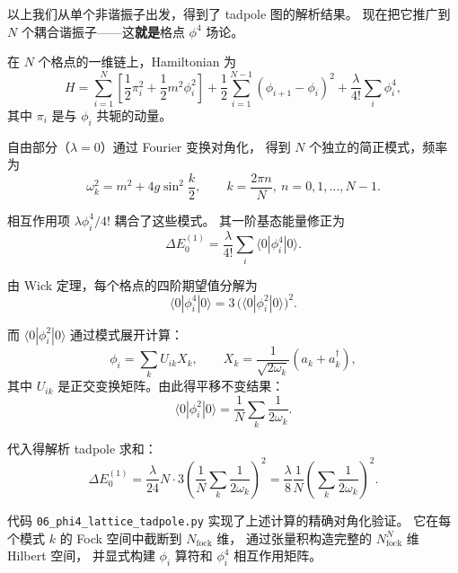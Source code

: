 \documentclass[12pt,a4paper]{article}
\begin{document}
以上我们从单个非谐振子出发，得到了 tadpole 图的解析结果。
现在把它推广到 $N$ 个耦合谐振子——这\textbf{就是}格点 $\phi^4$ 场论。

在 $N$ 个格点的一维链上，Hamiltonian 为
\begin{equation}
H = \sum_{i=1}^N \left[\frac12 \pi_i^2 + \frac12 m^2 \phi_i^2\right]
+ \frac12 \sum_{i=1}^{N-1} (\phi_{i+1} - \phi_i)^2
+ \frac{\lambda}{4!} \sum_i \phi_i^4,
\label{eq:lat-ham}
\end{equation}
其中 $\pi_i$ 是与 $\phi_i$ 共轭的动量。

自由部分（$\lambda=0$）通过 Fourier 变换对角化，
得到 $N$ 个独立的简正模式，频率为
\begin{equation}
\omega_k^2 = m^2 + 4g\sin^2\frac{k}{2},
\qquad k = \frac{2\pi n}{N},\ n=0,1,\ldots,N-1.
\label{eq:lat-dispersion}
\end{equation}

相互作用项 $\lambda\phi_i^4/4!$ 耦合了这些模式。
其一阶基态能量修正为
\begin{equation}
\Delta E_0^{(1)} = \frac{\lambda}{4!} \sum_i \langle 0| \phi_i^4 |0\rangle.
\label{eq:lat-1st}
\end{equation}

由 Wick 定理，每个格点的四阶期望值分解为
\begin{equation}
\langle 0| \phi_i^4 |0\rangle = 3\, \bigl(\langle 0| \phi_i^2 |0\rangle\bigr)^2.
\label{eq:phi4-wick}
\end{equation}

而 $\langle 0| \phi_i^2 |0\rangle$ 通过模式展开计算：
\begin{equation}
\phi_i = \sum_k U_{ik} X_k,\qquad
X_k = \frac{1}{\sqrt{2\omega_k}} (a_k + a_k^\dagger),
\label{eq:mode-expansion}
\end{equation}
其中 $U_{ik}$ 是正交变换矩阵。由此得平移不变结果：
\begin{equation}
\langle 0| \phi_i^2 |0\rangle = \frac{1}{N} \sum_k \frac{1}{2\omega_k}.
\label{eq:phi2-vac}
\end{equation}

代入得解析 tadpole 求和：
\begin{equation}
\Delta E_0^{(1)} = \frac{\lambda}{24} N \cdot 3 \left(\frac{1}{N}\sum_k \frac{1}{2\omega_k}\right)^2
= \frac{\lambda}{8}\frac{1}{N}\left(\sum_k \frac{1}{2\omega_k}\right)^2.
\label{eq:tadpole-sum}
\end{equation}

代码 \texttt{06\_phi4\_lattice\_tadpole.py} 实现了上述计算的精确对角化验证。
它在每个模式 $k$ 的 Fock 空间中截断到 $N_{\text{fock}}$ 维，
通过张量积构造完整的 $N_{\text{fock}}^N$ 维 Hilbert 空间，
并显式构建 $\phi_i$ 算符和 $\phi_i^4$ 相互作用矩阵。
\end{document}
